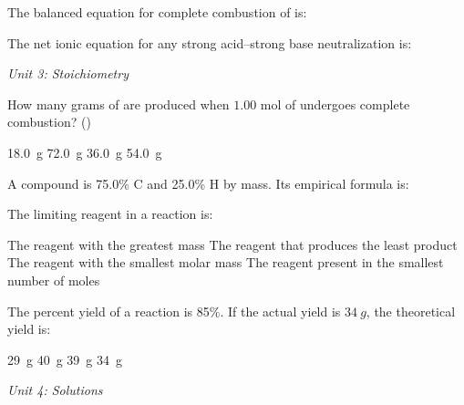\documentclass[addpoints]{exam}
\begin{document}
\begin{questions}
\question[1] The balanced equation for complete combustion of  is:
\begin{choices}
    \choice {}
    \correctchoice {}
    \choice {}
    \choice {}
\end{choices}

\question[1] The net ionic equation for any strong acid--strong base neutralization is:
\begin{choices}
    \choice {}
    \correctchoice {}
    \choice {}
    \choice {}
\end{choices}

\vspace{3mm}
\noindent\textit{Unit 3: Stoichiometry}
\vspace{3mm}

\question[1] How many grams of  are produced when $1.00$ mol of 
undergoes complete combustion? ()
\begin{choices}
    \choice \SI{18.0}{g}
    \correctchoice \SI{72.0}{g}
    \choice \SI{36.0}{g}
    \choice \SI{54.0}{g}
\end{choices}

\question[1] A compound is 75.0\% C and 25.0\% H by mass. Its empirical formula is:
\begin{choices}
    \choice {}
    \correctchoice {}
    \choice {}
    \choice {}
\end{choices}

\question[1] The limiting reagent in a reaction is:
\begin{choices}
    \choice The reagent with the greatest mass
    \correctchoice The reagent that produces the least product
    \choice The reagent with the smallest molar mass
    \choice The reagent present in the smallest number of moles
\end{choices}

\question[1] The percent yield of a reaction is 85\%. If the actual yield is $\SI{34}{g}$,
the theoretical yield is:
\begin{choices}
    \choice \SI{29}{g}
    \correctchoice \SI{40}{g}
    \choice \SI{39}{g}
    \choice \SI{34}{g}
\end{choices}

\vspace{3mm}
\noindent\textit{Unit 4: Solutions}
\vspace{3mm}


\end{questions}
\end{document}
